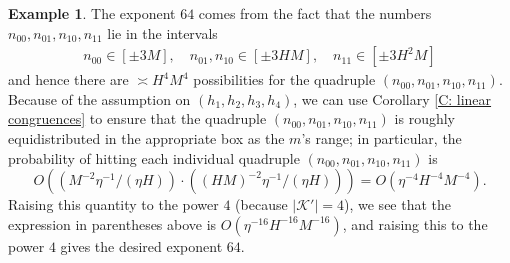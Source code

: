 \documentclass[11pt]{amsart}
\theoremstyle{definition}
\newtheorem{example}[lemma]{Example} %
\newcommand{\CK}{{\mathcal K}}
\begin{document}
\begin{example}
    The exponent $64$ comes from the fact that the numbers $n_{00}, n_{01}, n_{10}, n_{11}$ lie in the intervals
    \begin{align*}
        n_{00} \in [\pm 3M],\quad n_{01}, n_{10}\in [\pm 3HM],\quad n_{11}\in[\pm 3H^2M]
    \end{align*}
    and hence there are $\asymp H^4 M^4$ possibilities for the quadruple $(n_{00},n_{01},n_{10},n_{11})$.  Because of the assumption on $(h_1, h_2, h_3, h_4)$, we can use Corollary \ref{C: linear congruences} to ensure that the quadruple $(n_{00},n_{01},n_{10},n_{11})$ is roughly equidistributed in the appropriate box as the $m$'s range; in particular, the probability of hitting each individual quadruple $(n_{00},n_{01},n_{10},n_{11})$ is 
   $$O((M^{-2}\eta^{-1}/(\eta H)) \cdot ((HM)^{-2}\eta^{-1}/(\eta H)))=O(\eta^{-4}H^{-4}M^{-4}).$$ 
 Raising this quantity to the power $4$ (because $|\CK'|=4$), we see that the expression in parentheses above is $O(\eta^{-16}H^{-16}M^{-16})$, and raising this to the power $4$ gives the desired exponent $64$.
\end{example}
\end{document}
